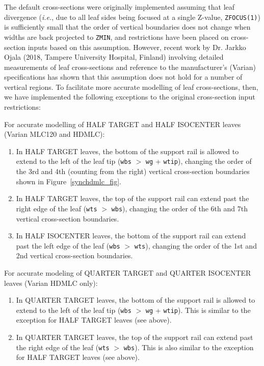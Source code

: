 \documentclass[12pt,twoside]{article}
\begin{document}
The default cross-sections were originally implemented assuming that leaf divergence ({\em i.e.}, due
to all leaf sides being focused at a single Z-value, {\tt ZFOCUS(1)}) is sufficiently small that
the order of vertical boundaries does not change when widths are back projected to {\tt ZMIN}, and
restrictions have been placed on cross-section inputs based on this assumption.  However, recent work
by Dr. Jarkko Ojala (2018, Tampere University Hospital, Finland) involving detailed measurements
of leaf cross-sections and reference to the manufacturer's (Varian) specifications has shown
that this assumption does not hold for a number of vertical regions.  To facilitate more accurate modelling
of leaf cross-sections, then, we have implemented the following exceptions to the original cross-section
input restrictions:

For accurate modelling of HALF TARGET and HALF ISOCENTER leaves (Varian MLC120 and HDMLC):
\renewcommand{\theenumi}{\roman{enumi}}%
\begin{enumerate}
\item In HALF TARGET leaves, the bottom of the support rail is allowed to extend to the left of the
leaf tip ({\tt wbs} $>$ {\tt wg} + {\tt wtip}), changing the
order of the 3rd and 4th (counting from the right) vertical cross-section boundaries shown in Figure~\ref{synchdmlc_fig}.
\item In HALF TARGET leaves, the top of the support rail can extend past the right edge
of the leaf ({\tt wts} $>$ {\tt wbs}), changing the order of the
6th and 7th vertical cross-section boundaries.
\item In HALF ISOCENTER leaves, the bottom of the support rail can extend past the left edge of the leaf
({\tt wbs} $>$ {\tt wts}), changing the order of the 1st and 2nd vertical cross-section boundaries.
\end{enumerate}

For accurate modeling of QUARTER TARGET and QUARTER ISOCENTER leaves (Varian HDMLC only):
\begin{enumerate}
\item In QUARTER TARGET leaves, the bottom of the support rail is allowed to extend to the left of the
leaf tip ({\tt wbs} $>$ {\tt wg} + {\tt wtip}).  This is similar to the exception for HALF TARGET leaves (see above).
\item In QUARTER TARGET leaves, the top of the support rail can extend past the right edge
of the leaf ({\tt wts} $>$ {\tt wbs}).  This is also similar to the exception for HALF TARGET leaves (see above).
\end{enumerate}
\end{document}
